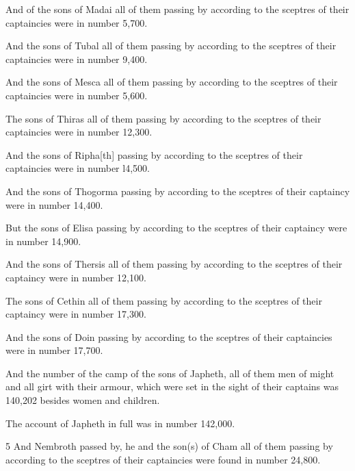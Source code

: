 \par And of the sons of Madai all of them passing by according to the sceptres of their captaincies were in number 5,700.

\par And the sons of Tubal all of them passing by according to the sceptres of their captaincies were in number 9,400.

\par And the sons of Mesca all of them passing by according to the sceptres of their captaincies were in number 5,600.

\par The sons of Thiras all of them passing by according to the sceptres of their captaincies were in number 12,300.

\par And the sons of Ripha[th] passing by according to the sceptres of their captaincies were in number l4,500.

\par And the sons of Thogorma passing by according to the sceptres of their captaincy were in number 14,400.

\par But the sons of Elisa passing by according to the sceptres of their captaincy were in number 14,900.

\par And the sons of Thersis all of them passing by according to the sceptres of their captaincy were in number 12,100.

\par The sons of Cethin all of them passing by according to the sceptres of their captaincy were in number 17,300.

\par And the sons of Doin passing by according to the sceptres of their captaincies were in number 17,700.

\par And the number of the camp of the sons of Japheth, all of them men of might and all girt with their armour, which were set in the sight of their captains was 140,202 besides women and children.

\par The account of Japheth in full was in number 142,000.

\par 5 And Nembroth passed by, he and the son(s) of Cham all of them passing by according to the sceptres of their captaincies were found in number 24,800.

